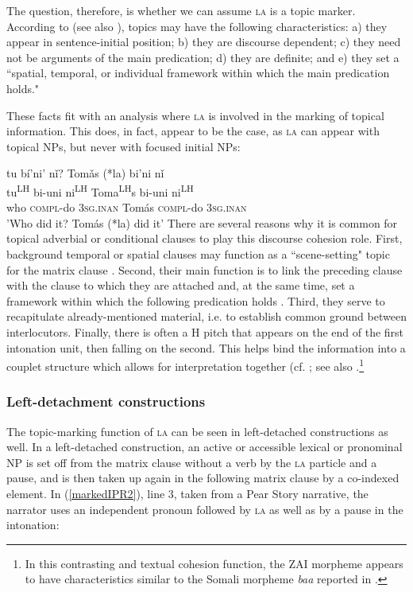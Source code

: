 The question, therefore, is whether we can assume \textsc{la} is a topic marker. According to \citet[50]{chafe1976} (see also \citealt{li1976}), topics may have the following characteristics: a) they appear in sentence-initial position; b) they are discourse dependent; c) they need not be arguments of the main predication; d) they are definite; and e) they set a ``spatial, temporal, or individual framework within which the main predication holds." 

These facts fit with an analysis where \textsc{la} is involved in the marking of topical information. This does, in fact, appear to be the case, as \textsc{la} can appear with topical NPs, but never with focused initial NPs:

\ea
{}tu b\'{i}'ni' n\v{i}? Tom\v{a}s (*la) bi'ni n\v{i} \\
tu\textsuperscript{LH} bi-uni ni\textsuperscript{LH} Toma\textsuperscript{LH}s { } bi-uni ni\textsuperscript{LH}  \\
who \textsc{compl}-do 3\textsc{sg.inan} Tom\'{a}s { } \textsc{compl}-do 3\textsc{sg.inan}  \\
\glt 'Who did it? Tom\'{a}s (*la) did it'
\z
There are several reasons why it is common for topical adverbial or conditional clauses to play this discourse cohesion role. First, background temporal or spatial clauses may function as a ``scene-setting" topic for the matrix clause \citep[125]{lambrecht1994}. Second, their main function is to link the preceding clause with the clause to which they are attached and, at the same time, set a framework within which the following predication holds \citep[294]{thompson2007}. Third, they serve to recapitulate already-mentioned material, i.e. to establish common ground between interlocutors. Finally, there is often a H pitch that appears on the end of the first intonation unit, then falling on the second. This helps bind the information into a couplet structure which allows for interpretation together (cf. ; see also \citet[126-7]{sicoli2007}.\footnote{In this contrasting and textual cohesion function, the ZAI morpheme appears to have characteristics similar to the Somali morpheme  \textit{baa} reported in \citet[138-140]{matic2013}.}


\subsubsection{Left-detachment constructions}

The topic-marking function of \textsc{la} can be seen in left-detached constructions as well. In a left-detached construction, an active or accessible lexical or pronominal NP is set off from the matrix clause without a verb by the \textsc{la} particle and a pause, and is then taken up again in the following matrix clause by a co-indexed element. In (\ref{markedIPR2}), line 3, taken from a Pear Story narrative, the narrator uses an independent pronoun followed by \textsc{la} as well as by a pause in the intonation: 


